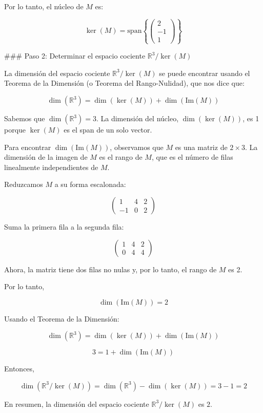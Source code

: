 \documentclass{article}
\begin{document}
Por lo tanto, el núcleo de \(M\) es:

\[ \ker(M) = \text{span}\left\{ \begin{pmatrix}
2 \\
-1 \\
1
\end{pmatrix} \right\} \]

### Paso 2: Determinar el espacio cociente \(\mathbb{R}^3 / \ker(M)\)

La dimensión del espacio cociente \(\mathbb{R}^3 / \ker(M)\) se puede encontrar usando el Teorema de la Dimensión (o Teorema del Rango-Nulidad), que nos dice que:

\[ \dim(\mathbb{R}^3) = \dim(\ker(M)) + \dim(\text{Im}(M)) \]

Sabemos que \(\dim(\mathbb{R}^3) = 3\). La dimensión del núcleo, \(\dim(\ker(M))\), es 1 porque \(\ker(M)\) es el span de un solo vector.

Para encontrar \(\dim(\text{Im}(M))\), observamos que \(M\) es una matriz de \(2 \times 3\). La dimensión de la imagen de \(M\) es el rango de \(M\), que es el número de filas linealmente independientes de \(M\).

Reduzcamos \(M\) a su forma escalonada:

\[ \begin{pmatrix}
1 & 4 & 2 \\
-1 & 0 & 2
\end{pmatrix} \]

Suma la primera fila a la segunda fila:

\[ \begin{pmatrix}
1 & 4 & 2 \\
0 & 4 & 4
\end{pmatrix} \]

Ahora, la matriz tiene dos filas no nulas y, por lo tanto, el rango de \(M\) es 2.

Por lo tanto,

\[ \dim(\text{Im}(M)) = 2 \]

Usando el Teorema de la Dimensión:

\[ \dim(\mathbb{R}^3) = \dim(\ker(M)) + \dim(\text{Im}(M)) \]

\[ 3 = 1 + \dim(\text{Im}(M)) \]

Entonces,

\[ \dim(\mathbb{R}^3 / \ker(M)) = \dim(\mathbb{R}^3) - \dim(\ker(M)) = 3 - 1 = 2 \]

En resumen, la dimensión del espacio cociente \(\mathbb{R}^3 / \ker(M)\) es \(2\).
\end{document}
